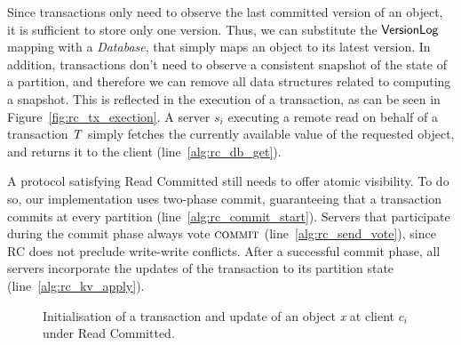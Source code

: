 Since transactions only need to observe the last committed version of an object, it is sufficient to store only one version. Thus, we can substitute the $\mathsf{VersionLog}$ mapping with a \emph{Database}, that simply maps an object to its latest version. In addition, transactions don't need to observe a consistent snapshot of the state of a partition, and therefore we can remove all data structures related to computing a snapshot. This is reflected in the execution of a transaction, as can be seen in Figure~\ref{fig:rc_tx_exection}. A server $s_i$ executing a remote read on behalf of a transaction $\mathit{T}$ simply fetches the currently available value of the requested object, and returns it to the client (line~\ref{alg:rc_db_get}).

A protocol satisfying Read Committed still needs to offer atomic visibility. To do so, our implementation uses two-phase commit, guaranteeing that a transaction commits at every partition (line~\ref{alg:rc_commit_start}). Servers that participate during the commit phase always vote $\text{\sc commit}$ (line~\ref{alg:rc_send_vote}), since RC does not preclude write-write conflicts. After a successful commit phase, all servers incorporate the updates of the transaction to its partition state (line~\ref{alg:rc_kv_apply}).

\begin{figure}[h]
\begin{algorithm}[H]
  \setcounter{AlgoLine}{0}

  \smallskip

\end{algorithm}
\caption{Initialisation of a transaction and update of an object \emph{x} at client $c_i$ under Read Committed.}
\end{figure}

